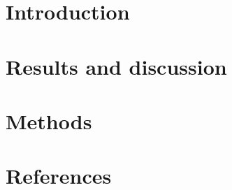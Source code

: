 




\maketitle

\begin{abstract}

\end{abstract}

\newpage
\section{Introduction}


\section{Results and discussion}



\section{Methods}








\newpage


\newpage
\section*{References}
\sloppy
\printbibliography[heading=none]{}
\fussy

%

%

%


